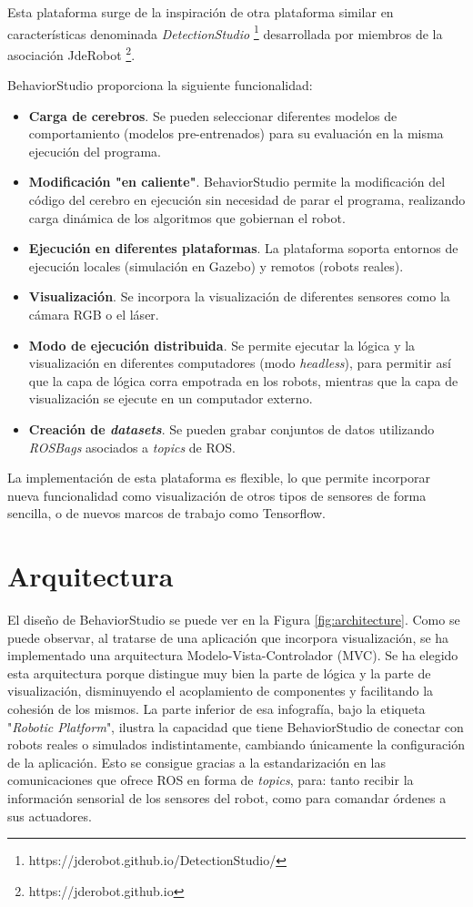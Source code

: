 Esta plataforma surge de la inspiración de otra plataforma similar en características denominada \textit{DetectionStudio} \footnote{https://jderobot.github.io/DetectionStudio/} desarrollada por miembros de la asociación JdeRobot \footnote{https://jderobot.github.io}.

\noindent BehaviorStudio proporciona la siguiente funcionalidad:

\begin{itemize}
    \item \textbf{Carga de cerebros}. Se pueden seleccionar diferentes modelos de comportamiento (modelos pre-entrenados) para su evaluación en la misma ejecución del programa.
    \item \textbf{Modificación "en caliente"}. BehaviorStudio permite la modificación del código del cerebro en ejecución sin necesidad de parar el programa, realizando carga dinámica de los algoritmos que gobiernan el robot.
    \item \textbf{Ejecución en diferentes plataformas}. La plataforma soporta entornos de ejecución locales (simulación en Gazebo) y remotos (robots reales).
    \item \textbf{Visualización}. Se incorpora la visualización de diferentes sensores como la cámara RGB o el láser.
    \item \textbf{Modo de ejecución distribuida}. Se permite ejecutar la lógica y la visualización en diferentes computadores (modo \textit{headless}), para permitir así que la capa de lógica corra empotrada en los robots, mientras que la capa de visualización se ejecute en un computador externo.
    \item \textbf{Creación de \textit{datasets}}. Se pueden grabar conjuntos de datos utilizando \textit{ROSBags} asociados a \textit{topics} de ROS.
\end{itemize}

La implementación de esta plataforma es flexible, lo que permite incorporar nueva funcionalidad como visualización de otros tipos de sensores de forma sencilla, o de nuevos marcos de trabajo como Tensorflow.

\section{Arquitectura}

El diseño de BehaviorStudio se puede ver en la Figura \ref{fig:architecture}. Como se puede observar, al tratarse de una aplicación que incorpora visualización, se ha implementado una arquitectura Modelo-Vista-Controlador (MVC). Se ha elegido esta arquitectura porque distingue muy bien la parte de lógica y la parte de visualización, disminuyendo el acoplamiento de componentes y facilitando la cohesión de los mismos. La parte inferior de esa infografía, bajo la etiqueta "\textit{Robotic Platform}", ilustra la capacidad que tiene BehaviorStudio de conectar con robots reales o simulados indistintamente, cambiando únicamente la configuración de la aplicación. Esto se consigue gracias a la estandarización en las comunicaciones que ofrece ROS en forma de \textit{topics}, para: tanto recibir la información sensorial de los sensores del robot, como para comandar órdenes a sus actuadores.

